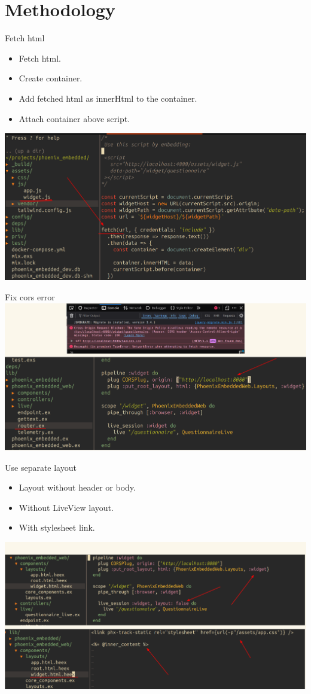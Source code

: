 \documentclass{beamer}
\begin{document}
\section{Methodology}

\begin{frame}{Fetch html}

  \begin{itemize}
    \item Fetch html.
    \item Create container.
    \item Add fetched html as innerHtml to the container.
    \item Attach container above script.
  \end{itemize}
  \centering
  \includegraphics[width=0.8\linewidth]{images/fetch-html.png}
\end{frame}

\begin{frame}{Fix cors error}
  \centering
  \includegraphics[width=0.8\linewidth]{images/cors.png}
\end{frame}

\begin{frame}{Use separate layout}
\begin{itemize}
  \item Layout without header or body.
  \item Without LiveView layout.
  \item With stylesheet link.
\end{itemize}
\centering
\includegraphics[width=0.8\linewidth]{images/layout.png}
\end{frame}
\end{document}
